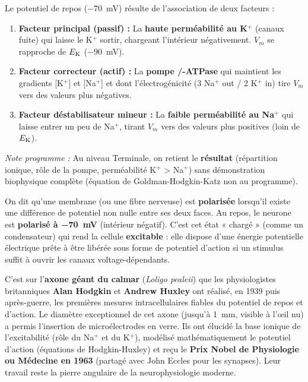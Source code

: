\documentclass[11pt]{article}
\newcounter{popsec}
\newcounter{popsub}
\newcommand{\courssub}[1]{%
  \stepcounter{popsub}%
  \par\vspace{9pt}\noindent{\popxbold\fontsize{11.5}{13}\selectfont\color{popink}{\color{poporange}\thepopsec.\thepopsub}\hspace{6pt}#1}\par\nopagebreak\vspace{4pt}
}
\begin{document}
\begin{aretenir}
Le potentiel de repos (\SI{-70}{mV}) résulte de l'association de deux facteurs :
\begin{enumerate}
    \item \textbf{Facteur principal (passif) :} La \textbf{haute perméabilité au K$^+$} (canaux fuite) qui laisse le K$^+$ sortir, chargeant l'intérieur négativement. $V_m$ se rapproche de $E_{\ce{K}}$ (\SI{-90}{mV}).
    \item \textbf{Facteur correcteur (actif) :} La \textbf{pompe /-ATPase} qui maintient les gradients [K$^+$] et [Na$^+$] et dont l'électrogénicité (3 Na$^+$ out / 2 K$^+$ in) tire $V_m$ vers des valeurs plus négatives.
    \item \textbf{Facteur déstabilisateur mineur :} La \textbf{faible perméabilité au Na$^+$} qui laisse entrer un peu de Na$^+$, tirant $V_m$ vers des valeurs plus positives (loin de $E_{\ce{K}}$).
\end{enumerate}
\emph{Note programme :} Au niveau Terminale, on retient le \textbf{résultat} (répartition ionique, rôle de la pompe, perméabilité K$^+$ > Na$^+$) sans démonstration biophysique complète (équation de Goldman-Hodgkin-Katz non au programme).
\end{aretenir}

\courssub{Le neurone au repos : une fibre polarisée}

\begin{definition}
On dit qu'une membrane (ou une fibre nerveuse) est \textbf{polarisée} lorsqu'il existe une différence de potentiel non nulle entre ses deux faces. Au repos, le neurone est \textbf{polarisé à \SI{-70}{mV}} (intérieur négatif). C'est cet état « chargé » (comme un condensateur) qui rend la cellule \textbf{excitable} : elle dispose d'une énergie potentielle électrique prête à être libérée sous forme de potentiel d'action si un stimulus suffit à ouvrir les canaux voltage-dépendants.
\end{definition}

\begin{savaistu}
C'est sur l'\textbf{axone géant du calmar} (\emph{Loligo pealeii}) que les physiologistes britanniques \textbf{Alan Hodgkin} et \textbf{Andrew Huxley} ont réalisé, en 1939 puis après-guerre, les premières mesures intracellulaires fiables du potentiel de repos et d'action. Le diamètre exceptionnel de cet axone (jusqu'à \SI{1}{mm}, visible à l'œil nu) a permis l'insertion de microélectrodes en verre. Ils ont élucidé la base ionique de l'excitabilité (rôle du Na$^+$ et du K$^+$), modélisé mathématiquement le potentiel d'action (équations de Hodgkin-Huxley) et reçu le \textbf{Prix Nobel de Physiologie ou Médecine en 1963} (partagé avec John Eccles pour les synapses). Leur travail reste la pierre angulaire de la neurophysiologie moderne.
\end{savaistu}
\end{document}
